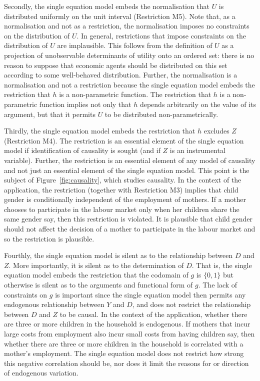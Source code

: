 \documentclass[10pt,a4paper,twoside]{article}
\numberwithin{equation}{section}
\begin{document}
Secondly, the single equation model embeds the normalisation that $U$ is distributed uniformly on the unit interval (Restriction M5). Note that, as a normalisation and not as a restriction, the normalisation imposes no constraints on the distribution of $U$. In general, restrictions that impose constraints on the distribution of $U$ are implausible. This follows from the definition of $U$ as a projection of unobservable determinants of utility onto an ordered set: there is no reason to suppose that economic agents should be distributed on this set according to some well-behaved distribution. Further, the normalisation is a normalisation and not a restriction because the single equation model embeds the restriction that $h$ is a non-parametric function. The restriction that $h$ is a non-parametric function implies not only that $h$ depends arbitrarily on the value of its argument, but that it permits $U$ to be distributed non-parametrically. 

Thirdly, the single equation model embeds the restriction that $h$ excludes $Z$ (Restriction M4). The restriction is an essential element of the single equation model if identification of causality is sought (and if $Z$ is an instrumental variable). Further, the restriction is an essential element of any model of causality and not just an essential element of the single equation model. This point is the subject of Figure~\ref{fig:causality}, which studies causality. In the context of the application, the restriction (together with Restriction M3) implies that child gender is conditionally independent of the employment of mothers. If a mother chooses to participate in the labour market only when her children share the same gender say, then this restriction is violated. It is plausible that child gender should not affect the decision of a mother to participate in the labour market and so the restriction is plausible.     

Fourthly, the single equation model is silent as to the relationship between $D$ and $Z$. More importantly, it is silent as to the determination of $D$. That is, the single equation model embeds the restriction that the codomain of $g$ is $\lbrace 0,1\rbrace$ but otherwise is silent as to the arguments and functional form of $g$. The lack of constraints on $g$ is important since the single equation model then permits any endogenous relationship between $Y$ and $D$, and does not restrict the relationship between $D$ and $Z$ to be causal. In the context of the application, whether there are three or more children in the household is endogenous. If mothers that incur large costs from employment also incur small costs from having children say, then whether there are three or more children in the household is correlated with a mother's employment. The single equation model does not restrict how strong this negative correlation should be, nor does it limit the reasons for or direction of endogenous variation. 
\end{document}
